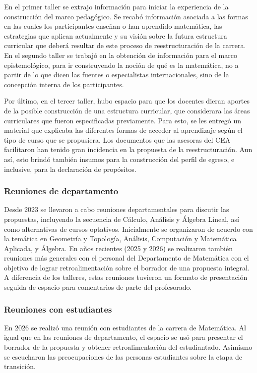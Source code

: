 En el primer taller se extrajo información para iniciar la experiencia de la construcción del marco pedagógico. Se recabó información asociada a las formas en las cuales los participantes enseñan o han aprendido matemática, las estrategias que aplican actualmente y su visión sobre la futura estructura curricular que deberá resultar de este proceso de reestructuración de la carrera. En el segundo taller se trabajó en la obtención de información para el marco epistemológico, para ir construyendo la noción de qué es la matemática, no a partir de lo que dicen las fuentes o especialistas internacionales, sino de la concepción interna de los participantes.

Por último, en el tercer taller, hubo espacio para que los docentes dieran aportes de la posible construcción de una estructura curricular, que considerara las áreas curriculares que fueron especificadas previamente. Para esto, se les entregó un material que explicaba las diferentes formas de acceder al aprendizaje según el tipo de curso que se propusiera. Los documentos que las asesoras del CEA facilitaron han tenido gran incidencia en la propuesta de la reestructuración. Aun así, esto brindó también insumos para la construcción del perfil de egreso, e inclusive, para la declaración de propósitos. 

\subsubsection{Reuniones de departamento}
Desde 2023 se llevaron a cabo reuniones departamentales para discutir las propuestas, incluyendo la secuencia de Cálculo, Análisis y Álgebra Lineal, así como alternativas de cursos optativos. Inicialmente se organizaron de acuerdo con la temática en Geometría y Topología, Análisis, Computación y Matemática Aplicada, y Álgebra.  
En años recientes (2025 y 2026) se realizaron también reuniones más generales con el personal del Departamento de Matemática con el objetivo de lograr retroalimentación sobre el borrador de una propuesta integral. A diferencia de los talleres, estas reuniones tuvieron un formato de presentación seguida de espacio para comentarios de parte del profesorado.

\subsubsection{Reuniones con estudiantes}
En 2026 se realizó una reunión con estudiantes de la carrera de Matemática. Al igual que en las reuniones de departamento, el espacio se usó para presentar el borrador de la propuesta y obtener retroalimentación del estudiantado. Asimismo se escucharon las preocupaciones de las personas estudiantes sobre la etapa de transición.

